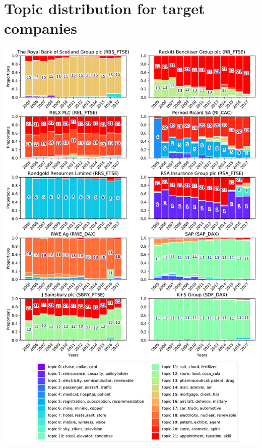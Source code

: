 \documentclass[12pt,journal,letterpaper,oneside,onecolumn]{IEEEtran}
\begin{document}
\section{Topic distribution for target companies}
\begin{center}
\includegraphics[width=0.85\linewidth]{images/companies_on_page_5.pdf}
\end{center}
\end{document}
